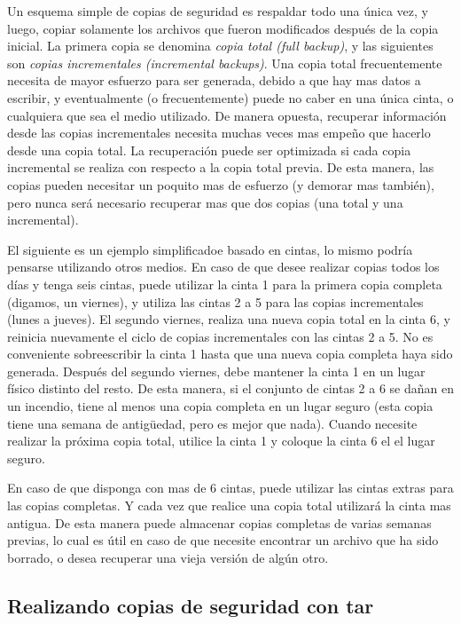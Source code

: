 ﻿\documentclass[12pt]{article}
\begin{document}
Un esquema simple de copias de seguridad es respaldar todo una única vez, 
y luego, copiar solamente los archivos que fueron modificados después de 
la copia inicial. La primera copia se denomina \textit{copia total (full 
backup)}, y las siguientes son \textit{copias incrementales 
(incremental backups)}. Una copia total frecuentemente necesita de mayor 
esfuerzo para ser generada, debido a que hay mas datos a escribir,
y eventualmente (o frecuentemente) puede no caber en una única cinta, o 
cualquiera que sea el medio utilizado.
De manera opuesta, recuperar información desde las copias
incrementales necesita muchas veces mas empeño que hacerlo desde una copia 
total. La recuperación puede ser optimizada si cada copia incremental se 
realiza con respecto a la copia total previa. De esta manera, las copias 
pueden necesitar un poquito mas de esfuerzo (y demorar mas también), 
pero nunca será necesario recuperar mas que dos copias (una total y una 
incremental).

El siguiente es un ejemplo simplificadoe basado en cintas, lo mismo podría 
pensarse utilizando otros medios. 
En caso de que desee realizar copias todos los días y tenga seis cintas, 
puede utilizar la cinta 1 para la primera copia completa (digamos, un 
viernes), y utiliza las cintas 2 a 5 para las copias incrementales 
(lunes a jueves). El segundo viernes, realiza una nueva copia total en la 
cinta 6, y reinicia nuevamente el ciclo de copias incrementales con las 
cintas 2 a 5. No es conveniente sobreescribir la cinta 1 hasta que una 
nueva copia completa haya sido generada. Después del segundo viernes, debe
mantener la cinta 1 en un lugar físico distinto del resto. De esta manera, 
si el conjunto de cintas 2 a 6 se dañan en un incendio, tiene al menos una 
copia completa en un lugar seguro (esta copia tiene una semana de 
antigüedad, pero es mejor que nada).  Cuando necesite realizar la próxima 
copia total, utilice la cinta 1 y coloque la cinta 6 el el lugar seguro.

En caso de que disponga con mas de 6 cintas, puede utilizar las cintas 
extras para las copias completas. Y cada vez que realice una copia total 
utilizará la cinta mas antigua. De esta manera puede almacenar copias
completas de varias semanas previas, lo cual es útil en caso de que necesite
encontrar un archivo que ha sido borrado, o desea recuperar una vieja 
versión de algún otro.

\subsection{ Realizando copias de seguridad con tar}
\end{document}
